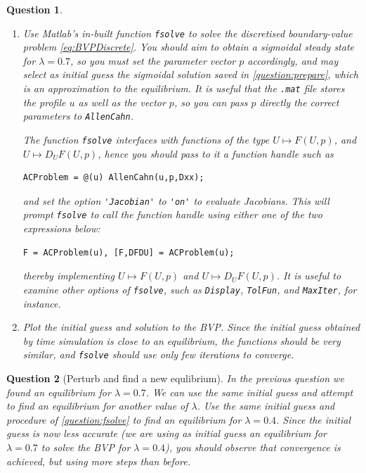 \documentclass[a4paper]{siamart220329}
\theoremstyle{plain}
\newtheorem{question}{Question}
\begin{document}
\begin{question}
\begin{enumerate}
    \item Use Matlab's in-built function \lstinline|fsolve| to solve the
      discretised boundary-value problem \cref{eq:BVPDiscrete}. You should aim to
      obtain a sigmoidal steady state for $\lambda = 0.7$, so you must set the
      parameter vector $p$ accordingly, and may select as initial guess the sigmoidal
      solution saved in \cref{question:prepare}, which is an approximation to the
      equilibrium. It is useful that the
      \lstinline|.mat| file stores the profile $u$ as well as the vector $p$, so you
      can pass $p$ directly the correct parameters to \lstinline|AllenCahn|.

      The function \lstinline|fsolve| interfaces with functions of the type 
      $U \mapsto F(U,p)$, and $U \mapsto D_UF(U,p)$, hence you should pass to it a
      function handle such as
\begin{lstlisting}[numbers=none]
  ACProblem = @(u) AllenCahn(u,p,Dxx);
\end{lstlisting}
      and set the option \lstinline|'Jacobian'| to \lstinline|'on'| to evaluate
      Jacobians. This will prompt \lstinline|fsolve| to call the function handle
      using either one of the two expressions below:
\begin{lstlisting}[numbers=none]
  F = ACProblem(u), [F,DFDU] = ACProblem(u);
\end{lstlisting}
      thereby implementing $U \mapsto F(U,p)$ and $U \mapsto D_UF(U,p)$. It is useful
      to examine other options of \lstinline|fsolve|, such as \lstinline|Display|,
      \lstinline|TolFun|, and \lstinline|MaxIter|, for instance.

    \item Plot the initial guess and solution to the BVP. Since the initial guess
      obtained by time simulation is close to an equilibrium, the functions should be very
      similar, and \lstinline|fsolve| should use only few iterations to converge.
  \end{enumerate}
  \end{question}

  \begin{question}[Perturb and find a new equlibrium]\label{question:perturbFsolve}
    In the previous question we found an equilibrium for $\lambda = 0.7$. We can use
    the same initial guess and attempt to find an equilibrium for another value of
    $\lambda$. Use the same initial guess and procedure of \cref{question:fsolve} to
    find an equilibrium for $\lambda = 0.4$. Since the initial guess is now less
    accurate (we are using as initial guess an equilibrium for $\lambda=0.7$ to solve
    the BVP for $\lambda = 0.4$), you should observe that convergence is achieved,
    but using more steps than before.
  \end{question}
\end{document}
